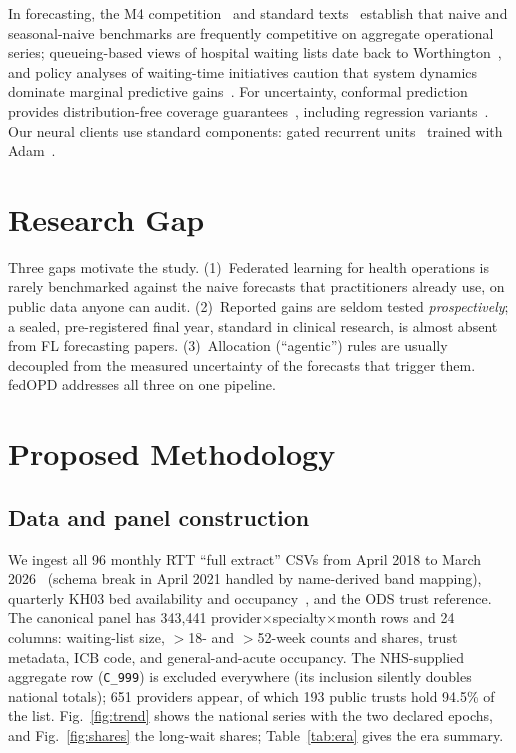 \documentclass[conference]{IEEEtran}
\begin{document}
In forecasting, the M4 competition~\cite{makridakis2020} and standard texts~\cite{hyndman2021}
establish that naive and seasonal-naive benchmarks are frequently competitive on aggregate
operational series; queueing-based views of hospital waiting lists date back to
Worthington~\cite{worthington1987}, and policy analyses of waiting-time initiatives caution that
system dynamics dominate marginal predictive gains~\cite{kreindler2010}. For uncertainty, conformal
prediction provides distribution-free coverage guarantees~\cite{vovk2005,angelopoulos2023},
including regression variants~\cite{romano2019}. Our neural clients use standard components: gated
recurrent units~\cite{cho2014} trained with Adam~\cite{kingma2015}.

\section{Research Gap}
Three gaps motivate the study. (1)~Federated learning for health operations is rarely benchmarked
against the naive forecasts that practitioners already use, on public data anyone can audit.
(2)~Reported gains are seldom tested \emph{prospectively}; a sealed, pre-registered final year,
standard in clinical research, is almost absent from FL forecasting papers. (3)~Allocation
(``agentic'') rules are usually decoupled from the measured uncertainty of the forecasts that
trigger them. fedOPD addresses all three on one pipeline.

\section{Proposed Methodology}

\subsection{Data and panel construction}
We ingest all 96 monthly RTT ``full extract'' CSVs from April 2018 to March 2026~\cite{nhsrtt}
(schema break in April 2021 handled by name-derived band mapping), quarterly KH03 bed availability
and occupancy~\cite{nhskh03}, and the ODS trust reference. The canonical panel has 343{,}441
provider$\times$specialty$\times$month rows and 24 columns: waiting-list size, $>$18- and
$>$52-week counts and shares, trust metadata, ICB code, and general-and-acute occupancy. The
NHS-supplied aggregate row (\texttt{C\_999}) is excluded everywhere (its inclusion silently doubles
national totals); 651 providers appear, of which 193 public trusts hold 94.5\% of the list.
Fig.~\ref{fig:trend} shows the national series with the two declared epochs, and
Fig.~\ref{fig:shares} the long-wait shares; Table~\ref{tab:era} gives the era summary.
\end{document}
